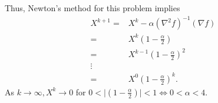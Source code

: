 \documentclass[12pt, leqno]{article}
\providecommand{\abs}[1]{\lvert#1\rvert}
\begin{document}
Thus, Newton's method for this problem implies 
\begin{align*}
X^{k+1} =& X^{k} - \alpha   (\nabla^2 f)^{-1} (\nabla f) \\
=& X^{k}( 1 - \frac{\alpha}{2})  \\
=& X^{k-1}( 1 - \frac{\alpha}{2})^2  \\
\vdots \\ 
=& X^{0}( 1 - \frac{\alpha}{2})^k .
\end{align*}
As $k \to \infty,X^{k} \to 0$ for $0<\abs{( 1 - \frac{\alpha}{2})}<1 \iff 0<\alpha<4$.
\end{document}
